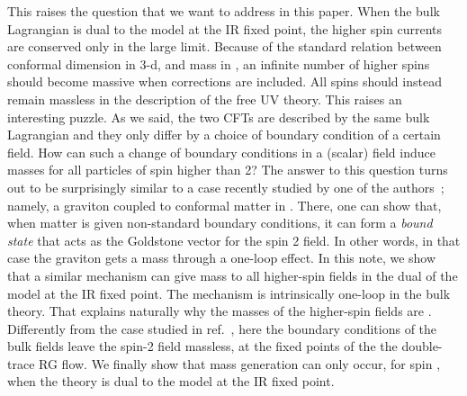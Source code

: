 \documentclass[a4paper,12pt]{article}
\begin{document}
This raises the question that we want to address in this paper.  When
the bulk Lagrangian is dual to the \coordHE{} model at the IR fixed point,
the higher spin currents are conserved only in the large \coordHE{} limit.
Because of the standard relation between conformal dimension in 3-d,
and mass in \coordHE{}, an infinite number of higher spins should become
massive when \coordHE{} corrections are included.  All spins should instead
remain massless in the description of the free UV theory. This raises
an interesting puzzle.  As we said, the two CFTs are described by the
same bulk Lagrangian and they only differ by a choice of boundary
condition of a certain field.  How can such a change of boundary
conditions in a (scalar) field induce masses for all particles of spin
higher than 2?  The answer to this question turns out to be
surprisingly similar to a case recently studied by one of the
authors~\cite{porrati}; namely, a graviton coupled to conformal matter
in \coordHE{}. There, one can show that, when matter is given
non-standard boundary conditions, it can form a {\em bound state} that
acts as the Goldstone vector for the spin 2 field.  In other words, in
that case the graviton gets a mass through a one-loop effect.  In this
note, we show that a similar mechanism can give mass to all
higher-spin fields in the dual of the \coordHE{} model at the IR fixed
point.  The mechanism is intrinsically one-loop in the bulk
theory. That explains naturally why the masses of the higher-spin
fields are \coordHE{}.  Differently from the case studied in
ref.~\cite{porrati}, here the boundary conditions of the bulk fields
leave the spin-2 field massless, at the fixed points of the the
double-trace RG flow.  We finally show that mass generation can only
occur, for spin \coordHE{}, when the \coordHE{} theory is dual to the \coordHE{}
model at the IR fixed point.
\end{document}
